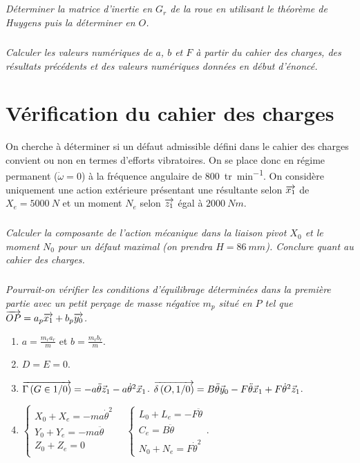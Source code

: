 \documentclass[10pt,fleqn]{article} %
\begin{document}
\begin{multicols}{2}
\subparagraph{}
\textit{Déterminer la matrice d'inertie en $G_r$ de la roue en utilisant le théorème de Huygens puis la déterminer en $O$.}

\subparagraph{}
\textit{Calculer les valeurs numériques de $a$, $b$ et $F$ à partir du cahier des charges, des résultats précédents et des valeurs numériques données en début d'énoncé.}


\section*{Vérification du cahier des charges}

On cherche à déterminer si un défaut admissible défini dans le cahier des charges convient ou non en termes d'efforts vibratoires.
On se place donc en régime permanent ($\dot{\omega}=0$) à la fréquence angulaire de \SI{800}{tr.min^{-1}}. On considère uniquement une action extérieure présentant une résultante selon $\overrightarrow{x_1}$ de $X_e=\SI{5000}{N}$ et un moment $N_e$ selon $\overrightarrow{z_1}$ égal à $\SI{2000}{Nm}$.


\subparagraph{}
\textit{Calculer la composante de l'action mécanique dans la liaison pivot $X_0$ et le moment $N_0$ pour un défaut maximal (on prendra $H=\SI{86}{mm}$). Conclure quant au cahier des charges.}


\subparagraph{}
\textit{Pourrait-on vérifier les conditions d'équilibrage déterminées dans la première partie avec un petit perçage de masse négative $m_p$ situé en $P$ tel que $\overrightarrow{OP} = a_p \overrightarrow{x_1} + b_p \overrightarrow{y_0}$.}


\vspace{2cm}

\begin{enumerate}
\item $a=\frac{m_r a_r}{m}$ et $b=\frac{m_r b_r}{m}$.
\item $D=E=0$.
\item $\overrightarrow{\Gamma \left( {G} \in {1}/{0}\right)}=-a\ddot{\theta} \vec{z}_1-a\dot{\theta}^2\vec{x}_1$. $\overrightarrow{\delta \left( {O}, {1} /{0}\right)}=B \ddot{\theta}\vec{y}_0 - F \ddot{\theta} \vec{x}_1 + F \dot{\theta}^2 \vec{z}_1$.


\item $
\left\{ \begin{array}{l}
X_0 + X_e = - m a \dot{\theta}^2 \\
Y_0 + Y_e = - m a \ddot{\theta} \\
Z_0 + Z_e = 0 \\
\end{array}
\right.
\quad
\left\{ \begin{array}{l}
L_0 +L_e = -F \ddot{\theta} \\
C_e = B \ddot{\theta} \\
N_0 +N_e= F \dot{\theta}^2
\end{array}
\right. .
$


\end{enumerate}
\end{multicols}
\end{document}
